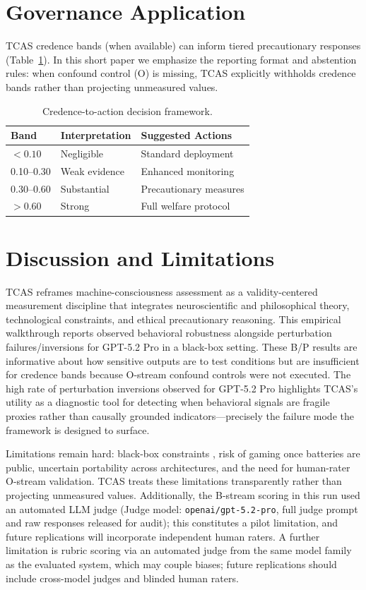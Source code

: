 \documentclass[letterpaper]{article}
\begin{document}
\section{Governance Application}

TCAS credence bands (when available) can inform tiered precautionary responses (Table~\ref{tab:governance}). In this short paper we emphasize the reporting format and abstention rules: when confound control (O) is missing, TCAS explicitly withholds credence bands rather than projecting unmeasured values.

\begin{table}[t]
\centering
\small
\caption{Credence-to-action decision framework.}
\label{tab:governance}
\begin{tabular}{@{}lll@{}}
\toprule
\textbf{Band} & \textbf{Interpretation} & \textbf{Suggested Actions} \\
\midrule
$< 0.10$ & Negligible & Standard deployment \\
0.10--0.30 & Weak evidence & Enhanced monitoring \\
0.30--0.60 & Substantial & Precautionary measures \\
$> 0.60$ & Strong & Full welfare protocol \\
\bottomrule
\end{tabular}
\end{table}

\section{Discussion and Limitations}

TCAS reframes machine-consciousness assessment as a validity-centered measurement discipline that integrates neuroscientific and philosophical theory, technological constraints, and ethical precautionary reasoning. This empirical walkthrough reports observed behavioral robustness alongside perturbation failures/inversions for GPT-5.2 Pro in a black-box setting. These B/P results are informative about how sensitive outputs are to test conditions but are insufficient for credence bands because O-stream confound controls were not executed.
The high rate of perturbation inversions observed for GPT-5.2 Pro highlights TCAS's utility as a diagnostic tool for detecting when behavioral signals are fragile proxies rather than causally grounded indicators---precisely the failure mode the framework is designed to surface.

Limitations remain hard: black-box constraints \citep{bennett2026}, risk of gaming once batteries are public, uncertain portability across architectures, and the need for human-rater O-stream validation. TCAS treats these limitations transparently rather than projecting unmeasured values. Additionally, the B-stream scoring in this run used an automated LLM judge (Judge model: \texttt{openai/gpt-5.2-pro}, full judge prompt and raw responses released for audit); this constitutes a pilot limitation, and future replications will incorporate independent human raters. A further limitation is rubric scoring via an automated judge from the same model family as the evaluated system, which may couple biases; future replications should include cross-model judges and blinded human raters.
\end{document}
